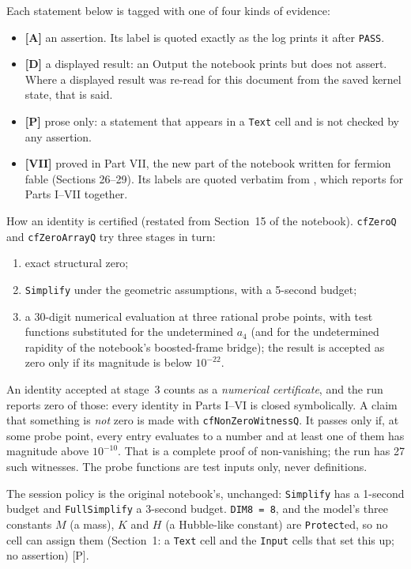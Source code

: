 Each statement below is tagged with one of four kinds of evidence:
\begin{itemize}
  \item \textbf{[A]} an assertion. Its label is quoted exactly as the log prints it after
        \texttt{PASS}.
  \item \textbf{[D]} a displayed result: an Output the notebook prints but does not assert.
        Where a displayed result was re-read for this document from the saved kernel state,
        that is said.
  \item \textbf{[P]} prose only: a statement that appears in a \texttt{Text} cell and is not
        checked by any assertion.
  \item \textbf{[VII]} proved in Part VII, the new part of the notebook written for fermion
        fable (Sections 26--29). Its labels are quoted verbatim from
        , which reports
         for Parts I--VII together.
\end{itemize}

How an identity is certified (restated from Section~15 of the notebook). \texttt{cfZeroQ} and
\texttt{cfZeroArrayQ} try three stages in turn:
\begin{enumerate}
  \item exact structural zero;
  \item \texttt{Simplify} under the geometric assumptions, with a 5-second budget;
  \item a 30-digit numerical evaluation at three rational probe points, with test functions
        substituted for the undetermined $a_4$ (and for the undetermined rapidity of the
        notebook's boosted-frame bridge); the result is accepted as zero only if its magnitude
        is below $10^{-22}$.
\end{enumerate}
An identity accepted at stage~3 counts as a \emph{numerical certificate}, and the run reports
zero of those: every identity in Parts I--VI is closed symbolically. A claim that something is
\emph{not} zero is made with \texttt{cfNonZeroWitnessQ}. It passes only if, at some probe point,
every entry evaluates to a number and at least one of them has magnitude above $10^{-10}$. That
is a complete proof of non-vanishing; the run has 27 such witnesses. The probe functions are
test inputs only, never definitions.

The session policy is the original notebook's, unchanged: \texttt{Simplify} has a 1-second budget
and \texttt{FullSimplify} a 3-second budget. \texttt{DIM8 = 8}, and the model's three constants
$M$ (a mass), $K$ and $H$ (a Hubble-like constant) are \texttt{Protect}ed, so no cell can assign
them (Section~1: a \texttt{Text} cell and the \texttt{Input} cells that set this up; no
assertion) [P].


